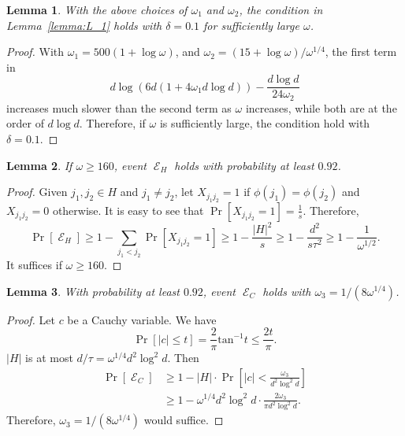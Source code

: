 \documentclass[11pt]{article}
\newtheorem{lemma}{Lemma}
\DeclareMathOperator{\E}{\mathcal{E}}
\begin{document}
\begin{lemma}
  With the above choices of $\omega_1$ and $\omega_2$, the condition in
  Lemma~\ref{lemma:L_1} holds with $\delta = 0.1$ for sufficiently large
  $\omega$.
\end{lemma}
\begin{proof}
  With $\omega_1 = 500 (1+\log \omega)$, and $\omega_2 = (15 + \log
  \omega)/\omega^{1/4}$, the first term in
  \begin{equation*}
    d \log \left( 6 d ( 1 + 4 \omega_1 d \log d ) \right) - \frac{d \log d}{24 \omega_2}
  \end{equation*}
  increases much slower than the second term as $\omega$ increases, while both
  are at the order of $d \log d$.
  Therefore, if $\omega$ is sufficiently large, the condition hold with $\delta
  = 0.1$.
\end{proof}

\begin{lemma}
  If $\omega \geq 160$, event $\E_H$ holds with probability at least
  $0.92$.
\end{lemma}
\begin{proof}
  Given $j_1, j_2 \in H$ and $j_1 \neq j_2$, let $X_{j_1j_2} = 1$ if $\phi(j_1)
  = \phi(j_2)$ and $X_{j_1j_2} = 0$ otherwise.
  It is easy to see that $\Pr[X_{j_1j_2} = 1] = \frac{1}{s}$.
  Therefore,
  \begin{equation*}
    \Pr[\E_H] \geq 1 - \sum_{j_1 < j_2} \Pr[X_{j_1j_2} = 1] 
    \geq 1 - \frac{|H|^2}{s} \geq 1 - \frac{d^2}{s \tau^2} \geq 1 - \frac{1}{\omega^{1/2}}.
  \end{equation*}
  It suffices if $\omega \geq 160$.
\end{proof}

\begin{lemma}
  With probability at least $0.92$, event $\E_C$ holds with $\omega_3 =
  1/(8 \omega^{1/4})$.
\end{lemma}
\begin{proof}
  Let $c$ be a Cauchy variable. We have
  \begin{equation*}
    \Pr[|c| \leq t] = \frac{2}{\pi} \text{tan}^{-1} t \leq \frac{2 t}{\pi}.
  \end{equation*}
  $|H|$ is at most $d/\tau = \omega^{1/4} d^2 \log^2 d$. Then
  \begin{align*}
    \Pr[\E_C] 
    &\geq 1 - |H| \cdot \Pr \left[|c| < \frac{\omega_3}{d^2 \log^2d} \right] \\
    &\geq 1 - \omega^{1/4} d^2 \log^2 d \cdot \frac{2 \omega_3}{\pi d^2 \log^2 d}.
  \end{align*}
  Therefore, $\omega_3 = 1/(8 \omega^{1/4})$ would suffice.
\end{proof}
\end{document}
